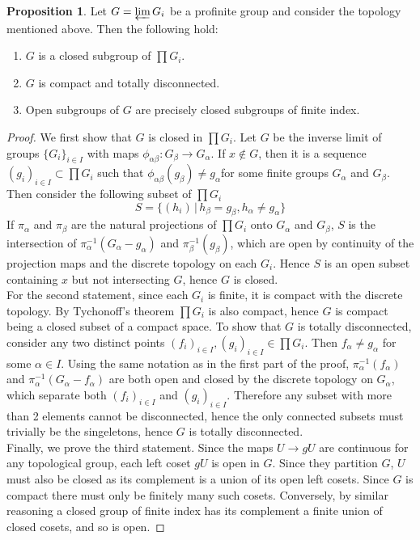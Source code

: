 \documentclass{article}
\theoremstyle{definition}
\newtheorem{proposition}[theorem]{Proposition}
\theoremstyle{remark}
\begin{document}
\begin{proposition}
	Let $G = \varprojlim G_i$ be a profinite group and consider the topology mentioned above.
	Then the following hold:
	\begin{enumerate}
		\item $G$ is a closed subgroup of $\prod G_i$.
		\item $G$ is compact and totally disconnected.
		\item Open subgroups of $G$ are precisely closed subgroups of finite index.
	\end{enumerate}
	
	\begin{proof}
		We first show that $G$ is closed in $\prod G_i$.
		Let $G$ be the inverse limit of groups $\{G_i\}_{i \in I}$ with maps $\phi_{\alpha \beta}: G_{\beta} \to G_{\alpha}$. 
		If $x \notin G$, then it is a sequence $(g_i)_{i \in I} \subset \prod G_i$ such that $\phi_{\alpha \beta} (g_{\beta}) \neq g_{\alpha}$for some finite groups $G_{\alpha}$ and $G_{\beta}$.
Then consider the following subset of $\prod G_i$
\[S  = \{(h_i) \,|\, h_{\beta} = g_{\beta}, h_{\alpha} \neq g_{\alpha}\}\]
If $\pi_{\alpha}$ and $\pi_{\beta}$ are the natural projections of $\prod G_i$ onto $G_{\alpha}$ and $G_{\beta}$, $S$ is the intersection of $\pi_{\alpha}^{-1}(G_{\alpha} - g_{\alpha})$ and $\pi_{\beta}^{-1}(g_{\beta})$, which are open by continuity of the projection maps and the discrete topology on each $G_i$.
Hence $S$ is an open subset containing $x$ but not intersecting $G$, hence $G$ is closed.\\
\indent For the second statement, since each $G_i$ is finite, it is compact with the discrete topology.
By Tychonoff's theorem $\prod G_i$ is also compact, hence $G$ is compact being a closed subset of a compact space.
To show that $G$ is totally disconnected, consider any two distinct points $(f_i)_{i \in I}, (g_i)_{i \in I} \in \prod G_i$.
Then $f_{\alpha} \neq g_{\alpha}$ for some $\alpha \in I$.
Using the same notation as in the first part of the proof, $\pi_{\alpha}^{-1}(f_{\alpha})$ and $\pi_{\alpha}^{-1}(G_{\alpha} - f_{\alpha})$ are both open and closed by the discrete topology on $G_{\alpha}$, which separate both $(f_i)_{i \in I}$ and $(g_i)_{i \in I}$.
Therefore any subset with more than 2 elements cannot be disconnected, hence the only connected subsets must trivially be the singeletons, hence $G$ is totally disconnected.\\
\indent Finally, we prove the third statement.
Since the maps $U \to gU$ are continuous for any topological group, each left coset $gU$ is open in $G$.
Since they partition $G$, $U$ must also be closed as its complement is a union of its open left cosets.
Since $G$ is compact there must only be finitely many such cosets.
Conversely, by similar reasoning a closed group of finite index has its complement a finite union of closed cosets, and so is open.
\end{proof}
	
\end{proposition}
\end{document}
